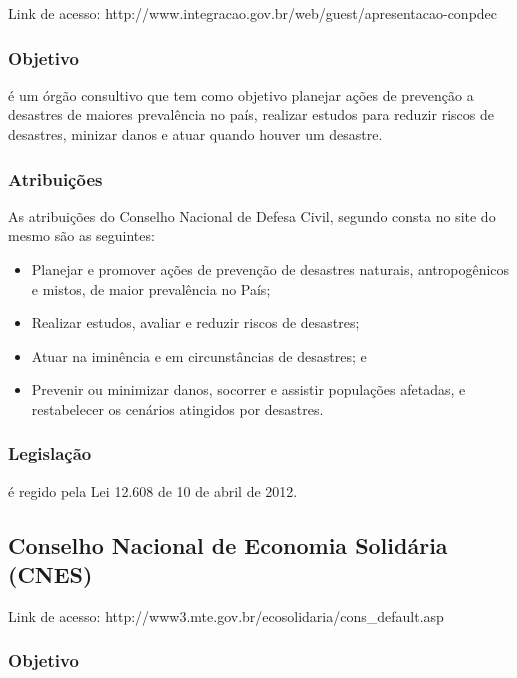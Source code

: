 Link de acesso:
http://www.integracao.gov.br/web/guest/apresentacao-conpdec

\subsubsection*{Objetivo}

é um órgão consultivo que tem como objetivo planejar ações
de prevenção a desastres de maiores prevalência no país,
realizar estudos para reduzir riscos de desastres, minizar danos e
atuar quando houver um desastre.


\subsubsection*{Atribuições}

As atribuições do Conselho Nacional de Defesa Civil, segundo
consta no site do mesmo são as seguintes:

\begin{itemize}
\item 
Planejar e promover ações de prevenção de desastres
naturais, antropogênicos e mistos, de maior prevalência no País;
\item 
Realizar estudos, avaliar e reduzir riscos de desastres;
\item 
Atuar na iminência e em circunstâncias de desastres; e
\item 
Prevenir ou minimizar danos, socorrer e assistir populações
afetadas, e restabelecer os cenários atingidos por desastres.
\end{itemize}

\subsubsection*{Legislação}

é regido pela Lei 12.608 de 10 de abril de 2012.
\newpage
\subsection*{Conselho Nacional de Economia Solidária (CNES)}

Link de acesso: http://www3.mte.gov.br/ecosolidaria/cons\_default.asp

\subsubsection*{Objetivo}

